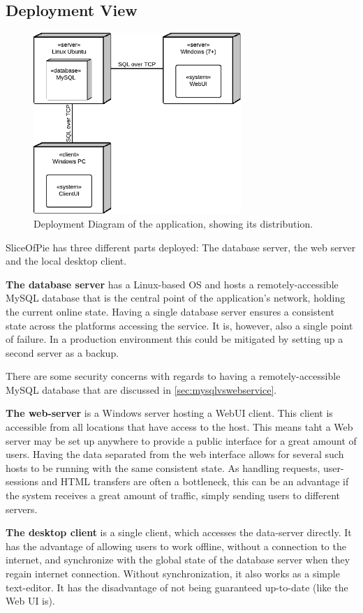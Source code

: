 \subsection{Deployment View}
\label{sec:deployment}

\begin{figure}[htb]
	\centering
	\includegraphics[width=0.7\textwidth]{Software_architecture/graphics/deployment-diag.png}
	\caption{Deployment Diagram of the application, showing its distribution.}
	\label{fig:deployment-diag}
\end{figure}

SliceOfPie has three different parts deployed: The database server, the web server and the local
desktop client.

{\bf The database server} has a Linux-based OS and hosts a remotely-accessible MySQL database
that is the central point of the application's network, holding the current online state. Having
a single database server ensures a consistent state across the platforms accessing the service.
It is, however, also a single point of failure. In a production environment this could be mitigated
by setting up a second server as a backup.

There are some security concerns with regards to having a remotely-accessible MySQL database that are
discussed in \ref{sec:mysqlvswebservice}.

{\bf The web-server} is a Windows server hosting a WebUI client. This client is accessible from all
locations that have access to the host. This means taht a Web server may be set up anywhere to provide
a public interface for a great amount of users. Having the data separated from the web interface allows
for several such hosts to be running with the same consistent state. As handling requests, user-sessions
and HTML transfers are often a bottleneck, this can be an advantage if the system receives a great
amount of traffic, simply sending users to different servers.

{\bf The desktop client} is a single client, which accesses the data-server directly. It has the advantage
of allowing users to work offline, without a connection to the internet, and synchronize with the global
state of the database server when they regain internet connection. Without synchronization, it also works
as a simple text-editor. It has the disadvantage of not being guaranteed up-to-date (like the Web UI is).